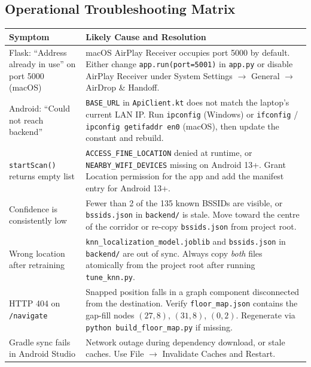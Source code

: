 \documentclass[11pt,a4paper]{article}
\begin{document}
\subsection{Operational Troubleshooting Matrix}
\begin{center}
\renewcommand{\arraystretch}{1.25}
\begin{longtable}{@{}p{}p{}@{}}
\toprule
\textbf{Symptom} & \textbf{Likely Cause and Resolution} \\ \midrule
Flask: ``Address already in use'' on port 5000 (macOS) & macOS AirPlay Receiver occupies port 5000 by default. Either change \texttt{app.run(port=5001)} in \texttt{app.py} or disable AirPlay Receiver under System Settings $\rightarrow$ General $\rightarrow$ AirDrop \& Handoff. \\
Android: ``Could not reach backend'' & \texttt{BASE\_URL} in \texttt{ApiClient.kt} does not match the laptop's current LAN IP. Run \texttt{ipconfig} (Windows) or \texttt{ifconfig} / \texttt{ipconfig getifaddr en0} (macOS), then update the constant and rebuild. \\
\texttt{startScan()} returns empty list & \texttt{ACCESS\_FINE\_LOCATION} denied at runtime, or \texttt{NEARBY\_WIFI\_DEVICES} missing on Android 13+. Grant Location permission for the app and add the manifest entry for Android 13+. \\
Confidence is consistently low & Fewer than 2 of the 135 known BSSIDs are visible, or \texttt{bssids.json} in \texttt{backend/} is stale. Move toward the centre of the corridor or re-copy \texttt{bssids.json} from project root. \\
Wrong location after retraining & \texttt{knn\_localization\_model.joblib} and \texttt{bssids.json} in \texttt{backend/} are out of sync. Always copy \emph{both} files atomically from the project root after running \texttt{tune\_knn.py}. \\
HTTP 404 on \texttt{/navigate} & Snapped position falls in a graph component disconnected from the destination. Verify \texttt{floor\_map.json} contains the gap-fill nodes $(27, 8)$, $(31, 8)$, $(0, 2)$. Regenerate via \texttt{python build\_floor\_map.py} if missing. \\
Gradle sync fails in Android Studio & Network outage during dependency download, or stale caches. Use File $\rightarrow$ Invalidate Caches and Restart. \\
\bottomrule
\end{longtable}
\end{center}
\end{document}
